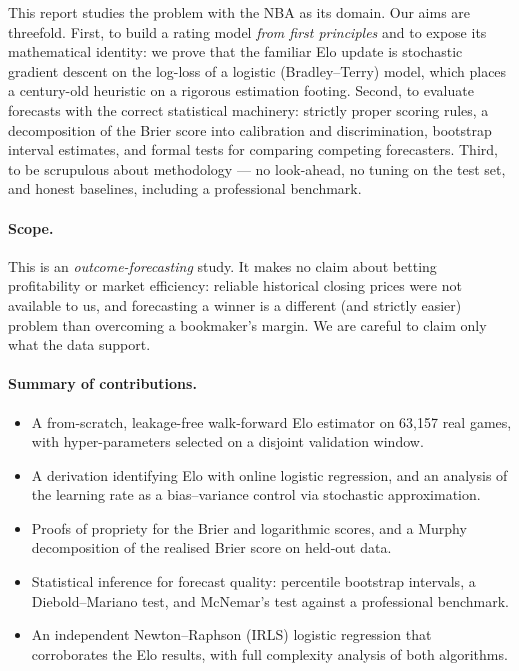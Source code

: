 \documentclass[11pt]{article}
\begin{document}
This report studies the problem with the NBA as its domain. Our aims are threefold.
First, to build a rating model \emph{from first principles} and to expose its
mathematical identity: we prove that the familiar Elo update is stochastic
gradient descent on the log-loss of a logistic (Bradley--Terry) model, which
places a century-old heuristic on a rigorous estimation footing. Second, to
evaluate forecasts with the correct statistical machinery: strictly proper
scoring rules, a decomposition of the Brier score into calibration and
discrimination, bootstrap interval estimates, and formal tests for comparing
competing forecasters. Third, to be scrupulous about methodology --- no
look-ahead, no tuning on the test set, and honest baselines, including a
professional benchmark.

\paragraph{Scope.} This is an \emph{outcome-forecasting} study. It makes no
claim about betting profitability or market efficiency: reliable historical
closing prices were not available to us, and forecasting a winner is a different
(and strictly easier) problem than overcoming a bookmaker's margin. We are
careful to claim only what the data support.

\paragraph{Summary of contributions.}
\begin{itemize}
\item A from-scratch, leakage-free walk-forward Elo estimator on 63{,}157 real
games, with hyper-parameters selected on a disjoint validation window.
\item A derivation identifying Elo with online logistic regression, and an
analysis of the learning rate as a bias--variance control via stochastic
approximation.
\item Proofs of propriety for the Brier and logarithmic scores, and a Murphy
decomposition of the realised Brier score on held-out data.
\item Statistical inference for forecast quality: percentile bootstrap intervals,
a Diebold--Mariano test, and McNemar's test against a professional benchmark.
\item An independent Newton--Raphson (IRLS) logistic regression that corroborates
the Elo results, with full complexity analysis of both algorithms.
\end{itemize}
\end{document}
